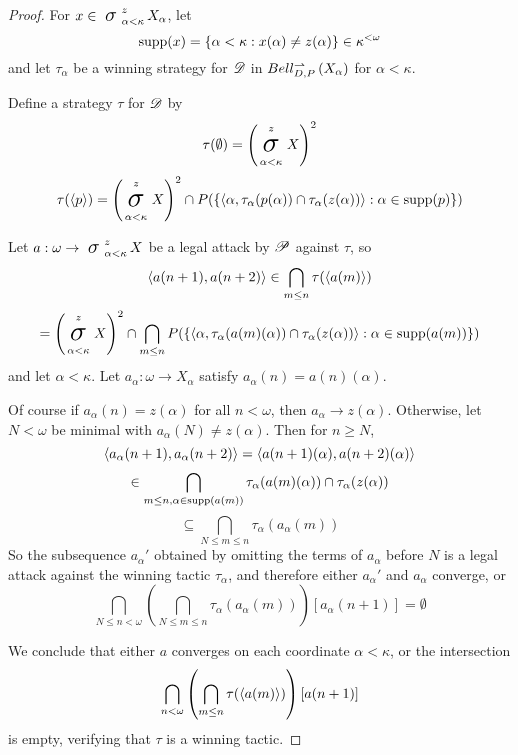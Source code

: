 \documentclass{amsart}
\theoremstyle{definition}
\begin{document}
  \begin{proof}
    For \(x\in\sigmaProd_{\alpha<\kappa}^z X_\alpha\), let
      \[
        \textrm{supp}(x)
          =
        \left\{
          \alpha<\kappa
        :
          x(\alpha)\not=z(\alpha)
        \right\}
          \in
        \kappa^{<\omega}
      \]
    and let \(\tau_\alpha\) be a winning strategy for \(\mathscr{D}\) in
    \(Bell_{D,P}^{\rightharpoonup}\left({X_\alpha}\right)\) for \(\alpha<\kappa\).

    Define a strategy \(\tau\) for \(\mathscr{D}\) by
      \[
        \tau(\emptyset)
          =
        \left(\sigmaProd_{\alpha<\kappa}^z X\right)^2
      \]
      \[
        \tau(\<p\>)
          =
        \left(\sigmaProd_{\alpha<\kappa}^z X\right)^2
          \cap
        P(\{
          \<
            \alpha,
            \tau_\alpha(p(\alpha))\cap\tau_\alpha(z(\alpha))
          \>
            :
          \alpha\in\supp(p)
        \})
      \]

    Let \(a:\omega\to \sigmaProd_{\alpha<\kappa}^z X\) be a legal
    attack by \(\mathscr{P}\) against \(\tau\), so
      \[
        \langle a(n+1),a(n+2)\rangle
          \in
        \bigcap_{m\leq n}
        \tau(\langle a(m)\rangle)
      \]
      \[
          =
        \left(\sigmaProd_{\alpha<\kappa}^z X\right)^2
          \cap
        \bigcap_{m\leq n}
        P(\{
          \<
            \alpha,
            \tau_\alpha(a(m)(\alpha))\cap\tau_\alpha(z(\alpha))
          \>
            :
          \alpha\in\supp(a(m))
        \})
      \]
    and let \(\alpha<\kappa\).
    Let \(a_\alpha:\omega\to X_\alpha\) satisfy
    \(a_\alpha(n)=a(n)(\alpha)\).

    Of course if \(a_\alpha(n)=z(\alpha)\) for all \(n<\omega\), then
    \(a_\alpha\to z(\alpha)\).
    Otherwise, let \(N<\omega\) be minimal with \(a_\alpha(N)\not=z(\alpha)\).
    Then for \(n\geq N\),
      \[
        \langle a_\alpha(n+1),a_\alpha(n+2)\rangle
          =
        \langle a(n+1)(\alpha),a(n+2)(\alpha)\rangle
      \]
      \[
          \in
        \bigcap_{m\leq n,\alpha\in\textrm{supp}(a(m))}
        \tau_\alpha(a(m)(\alpha))\cap\tau_\alpha(z(\alpha))
      \]
      \[
          \subseteq
        \bigcap_{N\leq m\leq n}
        \tau_\alpha(a_\alpha(m))
      \]
    So the subsequence \(a_\alpha'\) obtained by omitting the terms of
    \(a_\alpha\) before \(N\) is a legal attack against the
    winning tactic \(\tau_\alpha\), and therefore either
    \(a_\alpha'\) and \(a_\alpha\) converge, or
      \[
        \bigcap_{N\leq n<\omega}
        \left(
          \bigcap_{N\leq m\leq n}
          \tau_\alpha(a_\alpha(m))
        \right)
        [a_\alpha(n+1)]
          =
        \emptyset
      \]

    We conclude that either \(a\) converges on each coordinate
    \(\alpha<\kappa\), or the intersection
      \[
        \bigcap_{n<\omega}
        \left(
          \bigcap_{m\leq n}
          \tau(\langle a(m)\rangle)
        \right)
        [a(n+1)]
      \]
    is empty, verifying that \(\tau\) is a winning tactic.
  \end{proof}
\end{document}
